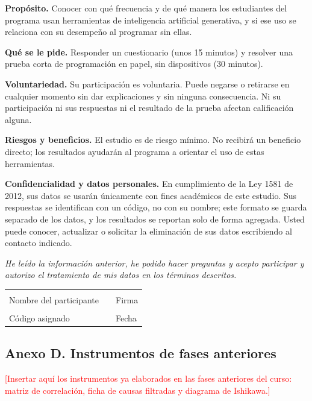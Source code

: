 \documentclass[12pt,letterpaper]{article}
\numberwithin{table}{section}
\numberwithin{figure}{section}
\newcommand{\pendiente}[1]{\textcolor{red}{[#1]}}
\begin{document}
\textbf{Propósito.} Conocer con qué frecuencia y de qué manera los estudiantes del programa usan herramientas de inteligencia artificial generativa, y si ese uso se relaciona con su desempeño al programar sin ellas.

\textbf{Qué se le pide.} Responder un cuestionario (unos 15 minutos) y resolver una prueba corta de programación en papel, sin dispositivos (30 minutos).

\textbf{Voluntariedad.} Su participación es voluntaria. Puede negarse o retirarse en cualquier momento sin dar explicaciones y sin ninguna consecuencia. Ni su participación ni sus respuestas ni el resultado de la prueba afectan calificación alguna.

\textbf{Riesgos y beneficios.} El estudio es de riesgo mínimo. No recibirá un beneficio directo; los resultados ayudarán al programa a orientar el uso de estas herramientas.

\textbf{Confidencialidad y datos personales.} En cumplimiento de la Ley 1581 de 2012, sus datos se usarán únicamente con fines académicos de este estudio. Sus respuestas se identifican con un código, no con su nombre; este formato se guarda separado de los datos, y los resultados se reportan solo de forma agregada. Usted puede conocer, actualizar o solicitar la eliminación de sus datos escribiendo al contacto indicado.

\emph{He leído la información anterior, he podido hacer preguntas y acepto participar y autorizo el tratamiento de mis datos en los términos descritos.}

\vspace{1.2cm}
\noindent
\begin{tabular}{@{}p{5.8cm}p{0.8cm}p{5.8cm}@{}}
\hrulefill & & \hrulefill \\
Nombre del participante & & Firma \\[1.0cm]
\hrulefill & & \hrulefill \\
Código asignado & & Fecha \\
\end{tabular}

\vspace{1cm}
\subsection*{Anexo D. Instrumentos de fases anteriores}

\pendiente{Insertar aquí los instrumentos ya elaborados en las fases anteriores del curso: matriz de correlación, ficha de causas filtradas y diagrama de Ishikawa.}
\end{document}
